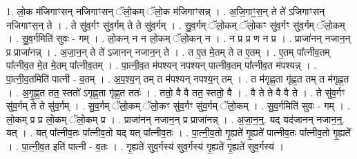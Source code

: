 \documentclass[17pt]{extarticle}
\begin{document}
1. लो॒क म॑जिगाꣳसन् नजिगाꣳसन् ॅलो॒कम् ॅलो॒क म॑जिगाꣳसन्न् । . अ॒जि॒गाꣳ॒॒स॒न् ते ते॑ ऽजिगाꣳसन् नजिगाꣳस॒न् ते । . ते सु॑व॒र्गꣳ सु॑व॒र्गम् ते ते सु॑व॒र्गम् । . सु॒व॒र्गम् ॅलो॒कम् ॅलो॒कꣳ सु॑व॒र्गꣳ सु॑व॒र्गम् ॅलो॒कम् । . सु॒व॒र्गमिति॑ सुवः - गम् । . लो॒कन् न न लो॒कम् ॅलो॒कन् न । . न प्र प्र ण न प्र । . प्राजा॑नन् नजान॒न् प्र प्राजा॑नन्न् । . अ॒जा॒न॒न् ते ते॑ ऽजानन् नजान॒न् ते । . त ए॒त मे॒तम् ते त ए॒तम् । . ए॒तम् पा᳚त्नीव॒तम् पा᳚त्नीव॒त मे॒त मे॒तम् पा᳚त्नीव॒तम् । . पा॒त्नी॒व॒त म॑पश्यन् नपश्यन् पात्नीव॒तम् पा᳚त्नीव॒त म॑पश्यन्न् । . पा॒त्नी॒व॒तमिति॑ पात्नी - व॒तम् । . अ॒प॒श्य॒न् तम् त म॑पश्यन् नपश्य॒न् तम् । . त म॑गृह्ण॒ता गृ॑ह्ण॒त तम् त म॑गृह्ण॒त । . अ॒गृ॒ह्ण॒त तत॒ स्ततो॑ ऽगृह्ण॒ता गृ॑ह्ण॒त ततः॑ । . ततो॒ वै वै तत॒ स्ततो॒ वै । . वै ते ते वै वै ते । . ते सु॑व॒र्गꣳ सु॑व॒र्गम् ते ते सु॑व॒र्गम् । . सु॒व॒र्गम् ॅलो॒कम् ॅलो॒कꣳ सु॑व॒र्गꣳ सु॑व॒र्गम् ॅलो॒कम् । . सु॒व॒र्गमिति॑ सुवः - गम् । . लो॒कम् प्र प्र लो॒कम् ॅलो॒कम् प्र । . प्राजा॑नन् नजान॒न् प्र प्राजा॑नन्न् । . अ॒जा॒न॒न्॒. यद् यद॑जानन् नजान॒न्॒. यत् । . यत् पा᳚त्नीव॒तः पा᳚त्नीव॒तो यद् यत् पा᳚त्नीव॒तः । . पा॒त्नी॒व॒तो गृ॒ह्यते॑ गृ॒ह्यते॑ पात्नीव॒तः पा᳚त्नीव॒तो गृ॒ह्यते᳚ । . पा॒त्नी॒व॒त इति॑ पात्नी - व॒तः । . गृ॒ह्यते॑ सुव॒र्गस्य॑ सुव॒र्गस्य॑ गृ॒ह्यते॑ गृ॒ह्यते॑ सुव॒र्गस्य॑ । \newline
\end{document}
